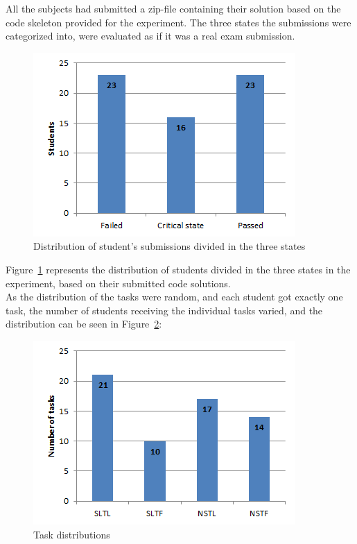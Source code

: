 \documentclass{sig-alternate-05-2015}
\begin{document}
All the subjects had submitted a zip-file containing their solution based on the code skeleton provided for the experiment. The three states the submissions were categorized into, were evaluated as if it was a real exam submission.

\begin{figure}[!ht]
	\centering
	\includegraphics[width=1\linewidth]{img01}
	\caption{Distribution of student's submissions divided in the three states}
	\label{fig:DistributionOfStudentPerformance}
\end{figure}
Figure~\ref{fig:DistributionOfStudentPerformance} represents the distribution of students divided in the three states in the experiment, based on their submitted code solutions.\\

As the distribution of the tasks were random, and each student got exactly one task, the number of students receiving the individual tasks varied, and the distribution can be seen in Figure~\ref{fig:TaskDistributions}:

\begin{figure}[!ht]
	\centering
	\includegraphics[width=1\linewidth]{img02}
	\caption{Task distributions}
	\label{fig:TaskDistributions}
\end{figure}
\end{document}
